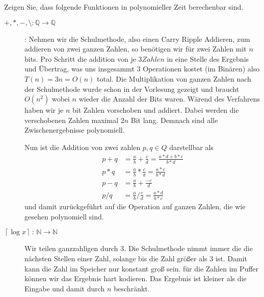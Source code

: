 \documentclass[11pt,a4paper,ngerman]{article}
\begin{document}
Zeigen Sie, dass folgende Funktionen in polynomieller Zeit berechenbar sind.\\

\begin{description}
    \item[$+,*,-,\setminus : \mathbb{Q} \rightarrow \mathbb{Q}$]:
        Nehmen wir die Schulmethode, also einen Carry Ripple Addieren,
        zum addieren von zwei ganzen Zahlen, so benötigen wir für zwei Zahlen mit
        $n$ bits. Pro Schritt die addition von je $3 Zahlen$ in eine Stelle des Ergebnis
        und Übertrag, was uns insgesammt 3 Operationen kostet (im Binären) also
        $T(n) = 3n = O(n)$ total. Die Multiplikation von ganzen Zahlen nach der Schulmethode
        wurde schon in der Vorlesung gezeigt und braucht $O(n^2)$ wobei $n$ wieder die Anzahl der
        Bits waren. Wärend des Verfahrens haben wir je $n$ bit Zahlen vorschoben und addiert.
        Dabei werden die verschobenen Zahlen maximal $2n$ Bit lang. Demnach sind alle Zwischenergebnisse polynomiell.
        
        Nun ist die Addition von zwei zahlen $p,q \in Q$ darstellbar als
        \begin{equation*}\begin{split}
            p + q &= \frac{a}{b} + \frac{c}{d} = \frac{a*d + b*c}{b*d}\\
            p * q &= \frac{a}{b} * \frac{c}{d} = \frac{a*c}{b*d}\\
            p - q &= \frac{a}{b} + \frac{-c}{d}\\
            p / q &= \frac{a}{b} / \frac{c}{d} = \frac{a*d}{b*c}
        \end{split}\end{equation*}
        und damit zurückgeführt auf die Operation auf ganzen Zahlen, die wie gesehen polynomiell sind.
    \item[$\left\lceil \log x\right\rceil \, : \, \mathbb{N} \rightarrow \mathbb{N}$]
        Wir teilen ganzzahligen durch $3$. Die Schulmethode nimmt immer die die nächsten Stellen einer Zahl, solange
        bis die Zahl größer als $3$ ist. Damit kann die Zahl im Speicher nur konstant groß sein. für die Zahlen
        im Puffer können wir das Ergebnis hart kodieren. Das Ergebnis ist kleiner als die Eingabe und damit durch $n$ beschränkt.\\


\end{description}
\end{document}
